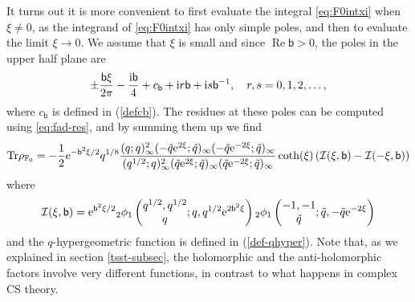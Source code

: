 \documentclass[a4paper,11pt]{article}
\theoremstyle{definition}
\def\IF{{\mathbb F}}
\newcommand{\tr}{{\rm Tr}}
\newcommand{\re}{{\rm e}}
\newcommand{\ri}{{\rm i}}
\def\tq{{\tilde{q}}}
\newcommand{\bb}{\mathsf{b}}
\DeclareMathOperator{\real}{Re}
\def\mc{\mathcal}
\newcommand{\qhg}[6]{{}_#1\phi_{#2}
  \left(\begin{matrix}
    #3  \\
    #4
  \end{matrix} ; #5, #6\right)}
\begin{document}
It turns out it is more convenient to first evaluate the integral
\eqref{eq:F0intxi} when $\xi \not=0$, as the integrand of
\eqref{eq:F0intxi} has only simple poles, and then to evaluate the
limit $\xi \rightarrow 0$. We assume that $\xi$ is small and since
$\real \bb >0$, the poles in the upper half plane are
\begin{equation}
  \pm\frac{\bb\xi}{2\pi} -\frac{\ri\bb}{4} + c_\bb +\ri r \bb +\ri
  s\bb^{-1},\quad r,s = 0,1,2,\ldots, 
\end{equation}
%
where $c_\bb$ is defined in (\ref{defcb}). 
The residues at these poles can be computed using \eqref{eq:fad-res}, and by summing
them up we find
%
\begin{equation}
  \tr\rho_{\IF_0} = -\frac{1}{2}\re^{-\bb^2\xi/2}q^{1/8}
  \frac{(q;q)_\infty^2(-\tq \re^{2\xi};\tq)_\infty
    (-\tq\re^{-2\xi};\tq)_\infty}
  {(q^{1/2};q)_\infty^2(\tq\re^{2\xi};\tq)_\infty
    (\tq\re^{-2\xi};\tq)_\infty}
  \coth(\xi)\left(\mc{I}(\xi,\bb) - \mc{I}(-\xi,\bb)\right)
  \label{eq:Z1facxi-F0}
\end{equation}
where
\begin{equation}
  \mc{I}(\xi,\bb) =
  \re^{\bb^2\xi/2}\qhg{2}{1}{q^{1/2},q^{1/2}}{q}{q}{q^{1/2}\re^{2\bb^2\xi}}
  \qhg{2}{1}{-1,-1}{\tq}{\tq}{-\tq\re^{-2\xi}}
\end{equation}
%
and the $q$-hypergeometric function is defined in (\ref{def-qhyper}). Note that, as we explained in section \ref{tsst-subsec}, 
the holomorphic and the anti-holomorphic factors involve 
very different functions, in contrast to what happens in complex CS theory. 
\end{document}
